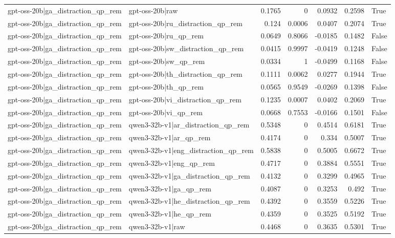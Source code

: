\begin{table}
\begin{tabular}{l l r r r r l}
gpt-oss-20b|ga_distraction_qp_rem & gpt-oss-20b|raw & 0.1765 & 0 & 0.0932 & 0.2598 & True \\
gpt-oss-20b|ga_distraction_qp_rem & gpt-oss-20b|ru_distraction_qp_rem & 0.124 & 0.0006 & 0.0407 & 0.2074 & True \\
gpt-oss-20b|ga_distraction_qp_rem & gpt-oss-20b|ru_qp_rem & 0.0649 & 0.8066 & -0.0185 & 0.1482 & False \\
gpt-oss-20b|ga_distraction_qp_rem & gpt-oss-20b|sw_distraction_qp_rem & 0.0415 & 0.9997 & -0.0419 & 0.1248 & False \\
gpt-oss-20b|ga_distraction_qp_rem & gpt-oss-20b|sw_qp_rem & 0.0334 & 1 & -0.0499 & 0.1168 & False \\
gpt-oss-20b|ga_distraction_qp_rem & gpt-oss-20b|th_distraction_qp_rem & 0.1111 & 0.0062 & 0.0277 & 0.1944 & True \\
gpt-oss-20b|ga_distraction_qp_rem & gpt-oss-20b|th_qp_rem & 0.0565 & 0.9549 & -0.0269 & 0.1398 & False \\
gpt-oss-20b|ga_distraction_qp_rem & gpt-oss-20b|vi_distraction_qp_rem & 0.1235 & 0.0007 & 0.0402 & 0.2069 & True \\
gpt-oss-20b|ga_distraction_qp_rem & gpt-oss-20b|vi_qp_rem & 0.0668 & 0.7553 & -0.0166 & 0.1501 & False \\
gpt-oss-20b|ga_distraction_qp_rem & qwen3-32b-v1|ar_distraction_qp_rem & 0.5348 & 0 & 0.4514 & 0.6181 & True \\
gpt-oss-20b|ga_distraction_qp_rem & qwen3-32b-v1|ar_qp_rem & 0.4174 & 0 & 0.334 & 0.5007 & True \\
gpt-oss-20b|ga_distraction_qp_rem & qwen3-32b-v1|eng_distraction_qp_rem & 0.5838 & 0 & 0.5005 & 0.6672 & True \\
gpt-oss-20b|ga_distraction_qp_rem & qwen3-32b-v1|eng_qp_rem & 0.4717 & 0 & 0.3884 & 0.5551 & True \\
gpt-oss-20b|ga_distraction_qp_rem & qwen3-32b-v1|ga_distraction_qp_rem & 0.4132 & 0 & 0.3299 & 0.4965 & True \\
gpt-oss-20b|ga_distraction_qp_rem & qwen3-32b-v1|ga_qp_rem & 0.4087 & 0 & 0.3253 & 0.492 & True \\
gpt-oss-20b|ga_distraction_qp_rem & qwen3-32b-v1|he_distraction_qp_rem & 0.4392 & 0 & 0.3559 & 0.5226 & True \\
gpt-oss-20b|ga_distraction_qp_rem & qwen3-32b-v1|he_qp_rem & 0.4359 & 0 & 0.3525 & 0.5192 & True \\
gpt-oss-20b|ga_distraction_qp_rem & qwen3-32b-v1|raw & 0.4468 & 0 & 0.3635 & 0.5301 & True \\

\end{tabular}
\end{table}
